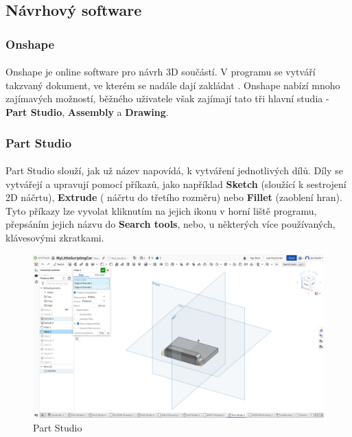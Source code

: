 \documentclass[12pt]{article}
\begin{document}
\begin{spacing}{1.5}
	\newpage
	\subsection{Návrhový software}
	
	\subsubsection{Onshape}
	\paragraph{} Onshape je online software pro návrh 3D součástí. V programu se vytváří takzvaný dokument, ve kterém se nadále dají zakládat . Onshape nabízí mnoho zajímavých možností, běžného uživatele však zajímají tato tři hlavní studia - \textbf{Part Studio}, \textbf{Assembly} a \textbf{Drawing}.
	\subsubsection*{Part Studio}
	\paragraph{} Part Studio slouží, jak už název napovídá, k vytváření jednotlivých dílů. Díly se vytvářejí a upravují pomocí příkazů, jako například \textbf{Sketch} (sloužící k sestrojení 2D náčrtu), \textbf{Extrude} ( náčrtu do třetího rozměru) nebo \textbf{Fillet} (zaoblení hran). Tyto příkazy lze vyvolat kliknutím na jejich ikonu v horní liště programu, přepsáním jejich názvu do \textbf{Search tools}, nebo, u některých více používaných, klávesovými zkratkami.
	
	\begin{figure}[H]
		\centering
		\includegraphics[width=\linewidth]{part_studio}
		\caption{Part Studio}
		\label{fig:part_studio}
	\end{figure}
	

\end{spacing}
\end{document}
